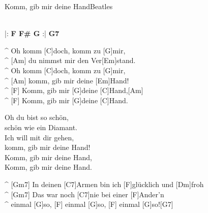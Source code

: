 \begin{song}{Komm, gib mir deine Hand}{Beatles}

 \\
|: \textbf{ F F\# G} :| \textbf{G7}

\begin{guitar}
^ Oh komm [C]doch, komm zu [G]mir,\\
^ [Am] du nimmst mir den Ver[Em]stand.\\
^ Oh komm [C]doch, komm zu [G]mir,\\
^ [Am] komm, gib mir deine [Em]Hand!\\
^ [F] Komm, gib mir [G]deine [C]Hand,[Am]\\
^ [F] Komm, gib mir [G]deine [C]Hand.\\
\end{guitar}

\begin{guitar}
Oh du bist so schön,\\
schön wie ein Diamant.\\
Ich will mit dir gehen,\\
komm, gib mir deine Hand!\\
Komm, gib mir deine Hand,\\
Komm, gib mir deine Hand.\\
\end{guitar}

\begin{guitar}
^ [Gm7] In deinen [C7]Armen bin ich [F]glücklich und [Dm]froh\\
^ [Gm7] Das war noch [C7]nie bei einer [F]Ander'n \\
^ einmal [G]so, [F] einmal [G]so, [F] einmal [G]so![G7]\\
\end{guitar}

\end{song}

